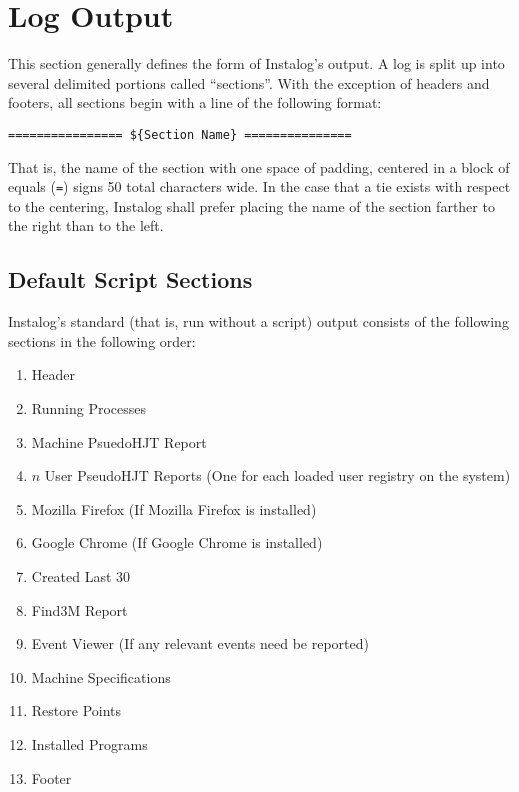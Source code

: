 \section{Log Output} \label{sec:log_output}
This section generally defines the form of Instalog's output. A log is split up
into several delimited portions called ``sections''. With the exception of
headers and footers, all sections begin with a line of the following format:

\begin{verbatim}
================ ${Section Name} ===============
\end{verbatim}

That is, the name of the section with one space of padding, centered in a block
of equals (\verb|=|) signs 50 total characters wide. In the case that a tie
exists with respect to the centering, Instalog shall prefer placing the name of
the section farther to the right than to the left.

\subsection{Default Script Sections} \label{sec:default_script_sections}
Instalog's standard (that is, run without a script) output consists of the
following sections in the following order:
\begin{enumerate}
    \item Header
    \item Running Processes
    \item Machine PsuedoHJT Report
    \item $n$ User PseudoHJT Reports (One for each loaded user registry on the
    system)
    \item Mozilla Firefox (If Mozilla Firefox is installed)
    \item Google Chrome (If Google Chrome is installed)
    \item Created Last 30
    \item Find3M Report
    \item Event Viewer (If any relevant events need be reported)
    \item Machine Specifications
    \item Restore Points
    \item Installed Programs
    \item Footer
\end{enumerate}

